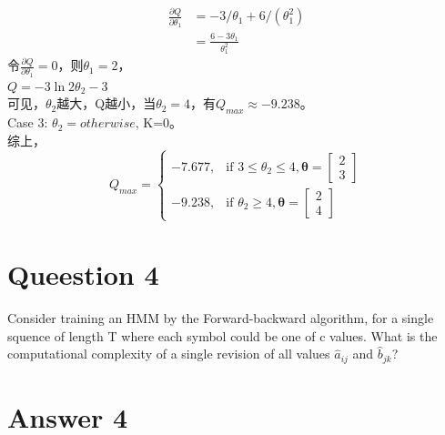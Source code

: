\documentclass[a4paper,11pt,onecolumn,oneside,UTF8]{article}
\begin{document}
$$
    \begin{aligned}
        \frac{\partial Q}{\partial \theta_1}
         & = -3/\theta_1+6/\left(\theta_1^2\right) \\
         & = \frac{6-3\theta_1}{\theta_1^2}
    \end{aligned}
$$
令$\frac{\partial Q}{\partial \theta_1} = 0$，则$\theta_1=2$，\\
$Q = -3\ln 2\theta_2-3$\\
可见，$\theta_2$越大，Q越小，当$\theta_2=4$，有$Q_{max} \approx -9.238$。\\
Case 3: $\theta_2=otherwise$, K=0。\\
综上，
$$
    Q_{max} = \begin{cases}
        -7.677, & \mbox{if }3\leq \theta_2\leq 4, \bm \theta = \left[ \begin{matrix}2\\3\end{matrix}\right] \\
        -9.238, & \mbox{if } \theta_2\geq 4, \bm \theta = \left[ \begin{matrix}2\\4\end{matrix}\right]
    \end{cases}
$$


\section*{Queestion 4}
Consider training an HMM by the Forward-backward algorithm, for a single
squence of length T where each symbol could be one of c values. What is the
computational complexity of a single revision of all values $\hat{a}_{ij}$
and $\hat{b}_{jk}$?

\section*{Answer 4}
\end{document}
